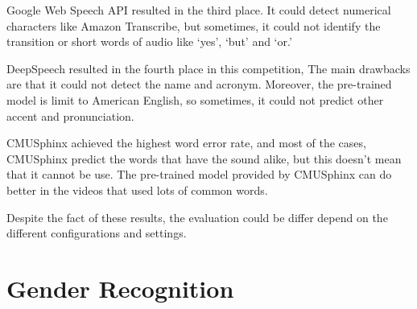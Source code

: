 \documentclass[natbib]{muthesis}
\begin{document}
 Google Web Speech API resulted in the third place. It could detect numerical characters like Amazon Transcribe, but sometimes, it could not identify the transition or short words of audio like `yes', `but' and `or.'
 
 DeepSpeech resulted in the fourth place in this competition, The main drawbacks are that it could not detect the name and acronym. Moreover, the pre-trained model is limit to American English, so sometimes, it could not predict other accent and pronunciation.
 
 CMUSphinx achieved the highest word error rate, and most of the cases, CMUSphinx predict the words that have the sound alike, but this doesn't mean that it cannot be use. The pre-trained model provided by CMUSphinx can do better in the videos that used lots of common words.
 
 Despite the fact of these results, the evaluation could be differ depend on the different configurations and settings.
 
 \section{Gender Recognition}
\end{document}
